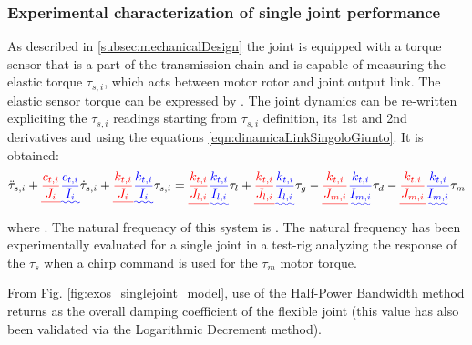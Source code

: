 \subsubsection{Experimental characterization of single joint performance}
As described in \ref{subsec:mechanicalDesign} the joint is equipped with a torque sensor that is a part of the transmission chain and is capable of measuring the elastic torque $\tau_{s,i}$, which acts between motor rotor and joint output link. The elastic sensor torque can be expressed by \DIFdelbegin {}\DIFdelend \DIFaddbegin {}\DIFaddend . The joint dynamics can be re-written expliciting the $\tau_{s,i}$ readings starting from  $\tau_{s,i}$ definition, its 1st and 2nd derivatives and using the equations  \ref{eqn:dinamicaLinkSingoloGiunto}. It is obtained:
\begin{equation}
\label{eqn:dinamicaSensoreCoppia}
\ddot{\tau}_{s,i} + \DIFdelbegin \DIFdel{\frac{c_{t,i}}{J_i}}\DIFdelend \DIFaddbegin \DIFadd{\frac{c_{t,i}}{I_i}}\DIFaddend \dot{\tau}_{s,i} + \DIFdelbegin \DIFdel{\frac{k_{t,i}}{J_i}}\DIFdelend \DIFaddbegin \DIFadd{\frac{k_{t,i}}{I_i}}\DIFaddend \tau_{s,i}= \DIFdelbegin \DIFdel{\frac{k_{t,i}}{J_{l,i}}}\DIFdelend \DIFaddbegin \DIFadd{\frac{k_{t,i}}{I_{l,i}}}\DIFaddend \tau_l + \DIFdelbegin \DIFdel{\frac{k_{t,i}}{J_{l,i}}}\DIFdelend \DIFaddbegin \DIFadd{\frac{k_{t,i}}{I_{l,i}}}\DIFaddend \tau_g - \DIFdelbegin \DIFdel{\frac{k_{t,i}}{J_{m,i}}}\DIFdelend \DIFaddbegin \DIFadd{\frac{k_{t,i}}{I_{m,i}}}\DIFaddend \tau_d - \DIFdelbegin \DIFdel{\frac{k_{t,i}}{J_{m,i}}}\DIFdelend \DIFaddbegin \DIFadd{\frac{k_{t,i}}{I_{m,i}}}\DIFaddend \tau_m
\end{equation}
where \DIFdelbegin {}\DIFdelend \DIFaddbegin {}\DIFaddend . The natural frequency of this system is \DIFdelbegin {}\DIFdelend \DIFaddbegin {}\DIFaddend . The natural frequency has been experimentally evaluated for a single joint in a test-rig analyzing the response of the $\tau_s$ when a chirp command is used for the $\tau_m$ motor torque. 
\par From Fig. \ref{fig:exos_singlejoint_model}, use of the Half-Power Bandwidth method returns \DIFdelbegin {}\DIFdelend \DIFaddbegin {}\DIFaddend as the overall damping coefficient of the flexible joint (this value has also been validated via the Logarithmic Decrement method).
